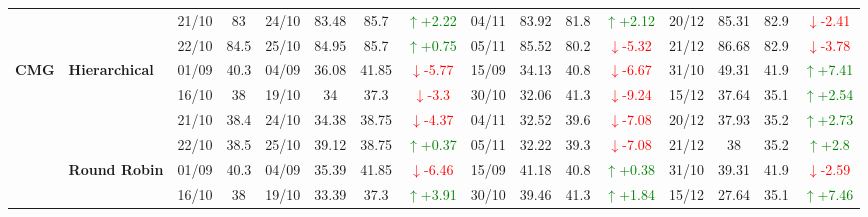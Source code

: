 \documentclass{ieeeaccess}
\begin{document}
{\begin{longtable}{llcc|cccc|cccc|cccc}
&
& 21/10 & 83 & 24/10 & 83.48 & 85.7 & \textcolor{green}{\(\uparrow\)+2.22} & 04/11 & 83.92 & 81.8 & \textcolor{green}{\(\uparrow\)+2.12} & 20/12 & 85.31 & 82.9 & \textcolor{red}{\(\downarrow\)-2.41} \\

&
& 22/10 & 84.5 & 25/10 & 84.95 & 85.7 & \textcolor{green}{\(\uparrow\)+0.75} & 05/11 & 85.52 & 80.2 & \textcolor{red}{\(\downarrow\)-5.32} & 21/12 & 86.68 & 82.9 & \textcolor{red}{\(\downarrow\)-3.78} \\




\midrule


\multirow{12}{*}{\textbf{CMG}} 
& \textbf{Hierarchical}
& 01/09 & 40.3 & 04/09 & 36.08 & 41.85 & \textcolor{red}{\(\downarrow\)-5.77} & 15/09 & 34.13 & 40.8 & \textcolor{red}{\(\downarrow\)-6.67} & 31/10 & 49.31 & 41.9 & \textcolor{green}{\(\uparrow\)+7.41} \\

& 
& 16/10 & 38 & 19/10 & 34 & 37.3 & \textcolor{red}{\(\downarrow\)-3.3} & 30/10 & 32.06 & 41.3 & \textcolor{red}{\(\downarrow\)-9.24} & 15/12 & 37.64 & 35.1 & \textcolor{green}{\(\uparrow\)+2.54} \\

& 
& 21/10 & 38.4 & 24/10 & 34.38 & 38.75 & \textcolor{red}{\(\downarrow\)-4.37} & 04/11 & 32.52 & 39.6 & \textcolor{red}{\(\downarrow\)-7.08} & 20/12 & 37.93 & 35.2 & \textcolor{green}{\(\uparrow\)+2.73} \\

&
& 22/10 & 38.5 & 25/10 & 39.12 & 38.75 & \textcolor{green}{\(\uparrow\)+0.37} & 05/11 & 32.22 & 39.3 & \textcolor{red}{\(\downarrow\)-7.08} & 21/12 & 38 & 35.2 & \textcolor{green}{\(\uparrow\)+2.8} \\
\cmidrule(lr){2-16}


& \textbf{Round Robin}
& 01/09 & 40.3 & 04/09 & 35.39 & 41.85 & \textcolor{red}{\(\downarrow\)-6.46} & 15/09 & 41.18 & 40.8 & \textcolor{green}{\(\uparrow\)+0.38} & 31/10 & 39.31 & 41.9 & \textcolor{red}{\(\downarrow\)-2.59} \\

& 
& 16/10 & 38 & 19/10 & 33.39 & 37.3 & \textcolor{green}{\(\uparrow\)+3.91} & 30/10 & 39.46 & 41.3 & \textcolor{green}{\(\uparrow\)+1.84} & 15/12 & 27.64 & 35.1 & \textcolor{green}{\(\uparrow\)+7.46} \\


\end{longtable}}
\end{document}
